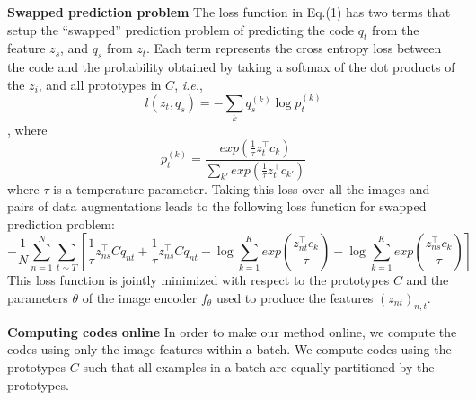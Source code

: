 \documentclass{tufte-handout}
\begin{document}
\textbf{Swapped prediction problem}
The loss function in Eq.(1) has two terms that setup the ``swapped'' prediction problem of predicting the code $q_t$ from the feature $z_s$, and $q_s$ from $z_t$.
Each term represents the cross entropy loss between the code and the probability obtained by taking a softmax of the dot products of the $z_i$, and all prototypes in $C$, \textit{i.e.},
\begin{equation}
  l(z_t, q_s) = - \sum_{k}q_s^{(k)}\log p_t^{(k)}
\end{equation}
, where
\begin{equation}
  p_t^{(k)} = \frac{exp(\frac{1}{\tau}z_t^\top c_k)}{\sum_{k'}exp(\frac{1}{\tau}z_t^\top c_{k'})}
\end{equation}
where $\tau$ is a temperature parameter. Taking this loss over all the images and pairs of data augmentations leads to the following loss function for swapped prediction problem:
\begin{equation}
  -\frac{1}{N}\sum_{n=1}^N \sum_{t \sim T}[\frac{1}{\tau}z_{ns}^\top C q_{nt} + \frac{1}{\tau}z_{ns}^\top C q_{nt}  -\log\sum_{k=1}^{K}exp(\frac{z_{nt}^\top c_k}{\tau}) -\log\sum_{k=1}^{K}exp(\frac{z_{ns}^\top c_k}{\tau})]
 \end{equation}
This loss function is jointly minimized with respect to the prototypes $C$ and the parameters $\theta$ of the image encoder $f_\theta$ used to produce the features $(z_{nt})_{n,t}$.

\textbf{Computing codes online} In order to make our method online, we compute the codes using only the image features within a batch. 
We compute codes using the prototypes $C$ such that all examples in a batch are equally partitioned by the prototypes.
\end{document}
